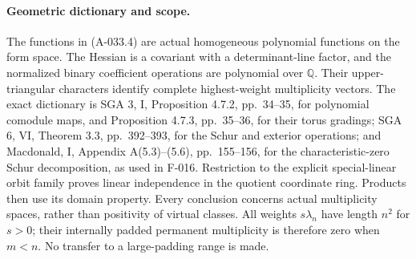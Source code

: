 \paragraph{Geometric dictionary and scope.}
The functions in (A-033.4) are actual homogeneous polynomial
functions on the form space. The Hessian is a covariant with
a determinant-line factor, and the normalized binary
coefficient operations are polynomial over \(\mathbb Q\).
Their upper-triangular characters identify complete
highest-weight multiplicity vectors. The exact dictionary is
SGA 3, I, Proposition 4.7.2, pp.~34--35, for polynomial
comodule maps, and Proposition 4.7.3, pp.~35--36, for their
torus gradings; SGA 6, VI, Theorem 3.3, pp.~392--393,
for the Schur and exterior operations; and Macdonald,
I, Appendix A(5.3)--(5.6), pp.~155--156, for the
characteristic-zero Schur decomposition, as used in F-016.
Restriction to the explicit special-linear orbit family proves
linear independence in the quotient coordinate ring.
Products then use its domain property.
Every conclusion concerns actual multiplicity spaces, rather
than positivity of virtual classes.
All weights \(s\lambda_n\) have length \(n^2\) for \(s>0\);
their internally padded permanent multiplicity is therefore
zero when \(m<n\). No transfer to a large-padding range is made.
